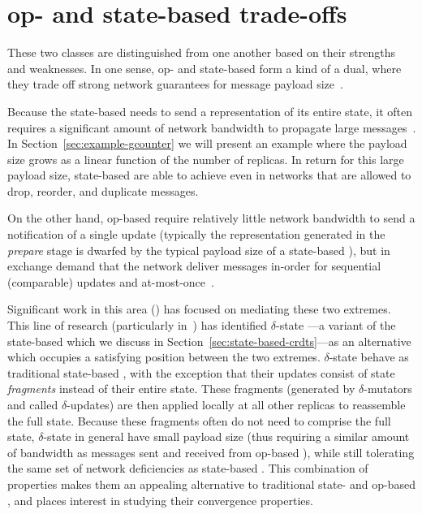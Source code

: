 \section{op- and state-based trade-offs}

These two classes are distinguished from one another based on their strengths
and weaknesses. In one sense, op- and state-based \CRDTs form a kind of a dual,
where they trade off strong network guarantees for message payload
size~\citep{baquero14}.

Because the state-based \CRDT needs to send a representation of its entire
state, it often requires a significant amount of network bandwidth to propagate
large messages~\citep{almedia18}. In Section~\ref{sec:example-gcounter} we will
present an example where the payload size grows as a linear function of the
number of replicas. In return for this large payload size, state-based \CRDTs
are able to achieve \SEC even in networks that are allowed to drop, reorder, and
duplicate messages.

On the other hand, op-based \CRDTs require relatively little network bandwidth
to send a notification of a single update (typically the representation
generated in the \textit{prepare} stage is dwarfed by the typical payload size
of a state-based \CRDT), but in exchange demand that the network deliver
messages in-order for sequential (comparable) updates and
at-most-once~\citep{shapiro11}.

Significant work in this area (\cite{almedia18, enes18, cabrita17,
vanDerLinde16}) has focused on mediating these two extremes. This line of
research (particularly in~\citet{almedia18}) has identified $\delta$-state
\CRDTs---a variant of the state-based \CRDT which we discuss in
Section~\ref{sec:state-based-crdts}---as an alternative which occupies a
satisfying position between the two extremes.  $\delta$-state \CRDTs behave as
traditional state-based \CRDTs, with the exception that their updates consist of
state \emph{fragments} instead of their entire state. These fragments (generated
by $\delta$-mutators and called $\delta$-updates) are then applied locally at
all other replicas to reassemble the full state. Because these fragments often
do not need to comprise the full state, $\delta$-state \CRDTs in general have
small payload size (thus requiring a similar amount of bandwidth as messages
sent and received from op-based \CRDTs), while still tolerating the same set of
network deficiencies as state-based \CRDTs. This combination of properties makes
them an appealing alternative to traditional state- and op-based \CRDTs, and
places interest in studying their convergence properties.

